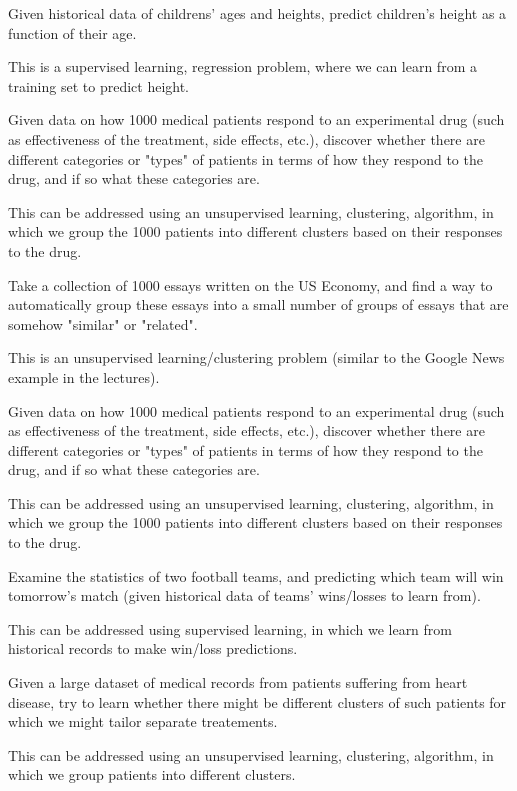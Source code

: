 Given historical data of childrens' ages and heights, predict children's height as a function of their age. 

This is a supervised learning, regression problem, where we can learn from a training set to predict height.


Given data on how 1000 medical patients respond to an experimental drug (such as effectiveness of the treatment, side effects, etc.), discover whether there are different categories or "types" of patients in terms of how they respond to the drug, and if so what these categories are.	

This can be addressed using an unsupervised learning, clustering, algorithm, in which we group the 1000 patients into different clusters based on their responses to the drug.

Take a collection of 1000 essays written on the US Economy, and find a way to automatically group these essays into a small number of groups of essays that are somehow "similar" or "related".		

This is an unsupervised learning/clustering problem (similar to the Google News example in the lectures).

Given data on how 1000 medical patients respond to an experimental drug (such as effectiveness of the treatment, side effects, etc.), discover whether there are different categories or "types" of patients in terms of how they respond to the drug, and if so what these categories are.	

This can be addressed using an unsupervised learning, clustering, algorithm, in which we group the 1000 patients into different clusters based on their responses to the drug.


Examine the statistics of two football teams, and predicting which team will win tomorrow's match (given historical data of teams' wins/losses to learn from).

This can be addressed using supervised learning, in which we learn from historical records to make win/loss predictions.

Given a large dataset of medical records from patients suffering from heart disease, try to learn whether there might be different clusters of such patients for which we might tailor separate treatements.	

This can be addressed using an unsupervised learning, clustering, algorithm, in which we group patients into different clusters.



